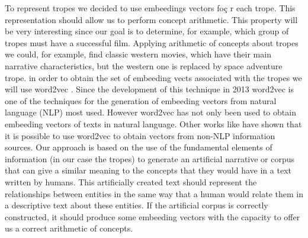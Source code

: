 \documentclass[letterpaper]{article}
\begin{document}
	To represent tropes we decided to use embeedings vectors foç r each trope. This representation should allow us to perform concept arithmetic. This property will be very interesting since our goal is to determine, for example, which group of tropes must have a successful film. Applying arithmetic of concepts about tropes we could, for example, find classic western movies, which have their main narrative characteristics, but the western one is replaced by space adventure trope. in order to obtain the set of embeeding vects associated with the tropes we will use word2vec \cite{mikolov2013}. Since the development of this technique in 2013 word2vec is one of the techniques for the generation of embeeding vectors from natural language (NLP) most used. However word2vec has not only been used to obtain embeeding vectors of texts in natural language. Other works like \cite{kazama2018} have shown that it is possible to use word2vec to obtain vectors from non-NLP information sources. Our approach is based on the use of the fundamental elements of information (in our case the tropes) to generate an artificial narrative or corpus that can give a similar meaning to the concepts that they would have in a text written by humans. This artificially created text should represent the relationships between entities in the same way that a human would relate them in a descriptive text about these entities. If the artificial corpus is correctly constructed, it should produce some embeeding vectors with the capacity to offer us a correct arithmetic of concepts. \\
	
	
	
	
\end{document}
